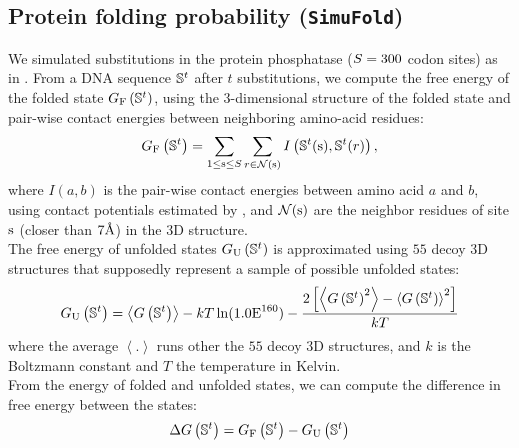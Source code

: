 \subsection{Protein folding probability (\texttt{SimuFold})}
\label{subsec:protein-folding-probability}

We simulated substitutions in the protein phosphatase ($S=300$ codon sites) as in \citet{Goldstein2017}.
From a \acrshort{DNA} sequence $\mathbb{S}^t$ after $t$ substitutions, we compute the free energy of the folded state $G_{\text{F}}\left(\mathbb{S}^{t}\right)$, using the $3$-dimensional structure of the folded state and pair-wise contact energies between neighboring amino-acid residues:
\begin{equation}
    G_{\text{F}} \left(\mathbb{S}^{t}\right) = \sum\limits_{1 \leq \text{s} \leq S} \sum\limits_{r \in \mathcal{N}(\text{s})} I \left(\mathbb{S}^t(\text{s}), \mathbb{S}^t(r) \right),
\end{equation}
where $I(a,b)$ is the pair-wise contact energies between amino acid $a$ and $b$, using contact potentials estimated by \citet{Miyazawa1985}, and $\mathcal{N}(\text{s})$ are the neighbor residues of site $\text{s}$ (closer than $7\text{\normalfont\AA}$) in the $3$D structure.\\

The free energy of unfolded states $G_{\text{U}} \left(\mathbb{S}^{t}\right)$ is approximated using $55$ decoy $3$D structures that supposedly represent a sample of possible unfolded states:
\begin{equation}
    G_{\text{U}} \left(\mathbb{S}^{t}\right) = \left\langle G\left(\mathbb{S}^{t}\right) \right\rangle - kT \ln (1.0\text{E}^{160}) - \dfrac{2 \left[ \left\langle G\left(\mathbb{S}^{t}\right)^2 \right\rangle - \left\langle G\left(\mathbb{S}^{t}\right) \right\rangle^2\right] }{kT}
\end{equation}
where the average $\left\langle . \right\rangle$ runs other the $55$ decoy $3$D structures, and $k$ is the Boltzmann constant and $T$ the temperature in Kelvin.\\

From the energy of folded and unfolded states, we can compute the difference in free energy between the states:
\begin{equation}
    \Delta G\left(\mathbb{S}^{t}\right) = G_{\text{F}} \left(\mathbb{S}^{t}\right) - G_{\text{U}} \left(\mathbb{S}^{t}\right)
\end{equation}

